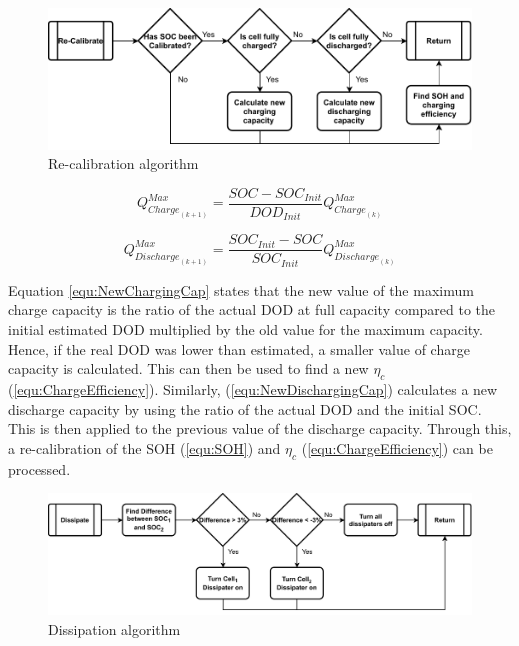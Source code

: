 \documentclass[10pt,twoside]{article}
\begin{document}
\begin{figure}[hbt]
    \centering
    \includegraphics[scale = 0.65]{Recalibration (1).pdf}
    \caption{Re-calibration algorithm}
    \label{fig:RecalibrationAlgorithm}
\end{figure}

\noindent\begin{minipage}{.49\linewidth}
\begin{equation}
    Q^{Max}_{{Charge}_{(k+1)}} = \frac{SOC - SOC_{Init}}{DOD_{Init}}Q^{Max}_{{Charge}_{(k)}}
    \label{equ:NewChargingCap}
\end{equation}
\end{minipage}
\begin{minipage}{.49\linewidth}
\begin{equation}
    Q^{Max}_{{Discharge}_{(k+1)}} = \frac{SOC_{Init} - SOC}{SOC_{Init}}Q^{Max}_{{Discharge}_{(k)}}
    \label{equ:NewDischargingCap}
\end{equation}
\end{minipage}

Equation \ref{equ:NewChargingCap} states that the new value of the maximum charge capacity is the ratio of the actual DOD at full capacity compared to the initial estimated DOD multiplied by the old value for the maximum capacity. Hence, if the real DOD was lower than estimated, a smaller value of charge capacity is calculated. This can then be used to find a new $\eta_c$ (\ref{equ:ChargeEfficiency}). Similarly, (\ref{equ:NewDischargingCap}) calculates a new discharge capacity by using the ratio of the actual DOD and the initial SOC. This is then applied to the previous value of the discharge capacity. Through this, a re-calibration of the SOH (\ref{equ:SOH}) and $\eta_c$ (\ref{equ:ChargeEfficiency}) can be processed.
\begin{figure}[hbt!]
    \centering
    \includegraphics[scale = 0.65]{Dissipate (3).pdf}
    \caption{Dissipation algorithm}
    \label{fig:DisAlgorithm}
\end{figure}
\end{document}
